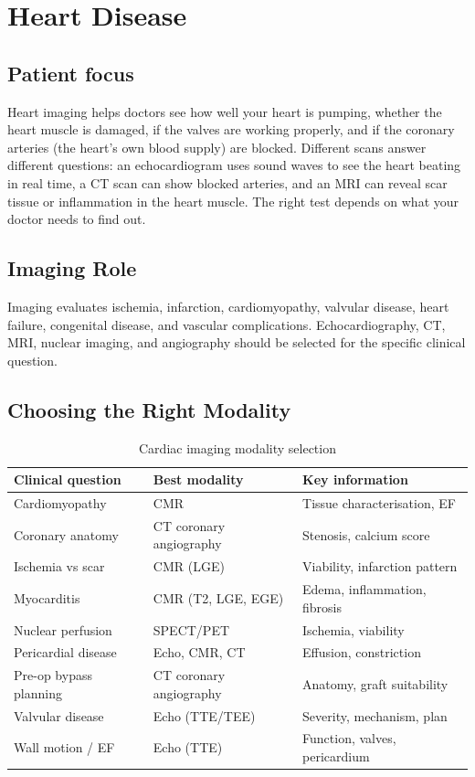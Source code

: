 \chapter{Heart Disease}

\section*{Patient focus}
Heart imaging helps doctors see how well your heart is pumping, whether the heart muscle is damaged, if the valves are working properly, and if the coronary arteries (the heart's own blood supply) are blocked. Different scans answer different questions: an echocardiogram uses sound waves to see the heart beating in real time, a CT scan can show blocked arteries, and an MRI can reveal scar tissue or inflammation in the heart muscle. The right test depends on what your doctor needs to find out.


\label{ch:ch61_heart_disease}

\section{Imaging Role}
Imaging evaluates ischemia, infarction, cardiomyopathy, valvular disease, heart failure, congenital disease, and vascular complications. Echocardiography, CT, MRI, nuclear imaging, and angiography should be selected for the specific clinical question.

\section{Choosing the Right Modality}

\begin{table}[h]
\centering
\caption{Cardiac imaging modality selection}
\begin{tabular}{|l|l|l|}
\hline
\textbf{Clinical question} & \textbf{Best modality} & \textbf{Key information} \\
\hline
Cardiomyopathy & CMR & Tissue characterisation, EF \\
Coronary anatomy & CT coronary angiography & Stenosis, calcium score \\
Ischemia vs scar & CMR (LGE) & Viability, infarction pattern \\
Myocarditis & CMR (T2, LGE, EGE) & Edema, inflammation, fibrosis \\
Nuclear perfusion & SPECT/PET & Ischemia, viability \\
Pericardial disease & Echo, CMR, CT & Effusion, constriction \\
Pre-op bypass planning & CT coronary angiography & Anatomy, graft suitability \\
Valvular disease & Echo (TTE/TEE) & Severity, mechanism, plan \\
Wall motion / EF & Echo (TTE) & Function, valves, pericardium \\
\hline
\end{tabular}
\end{table}

